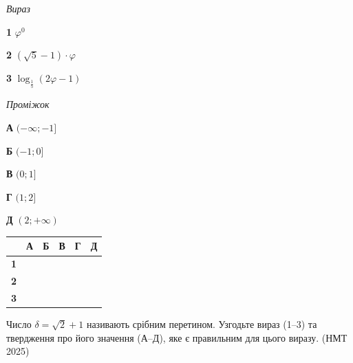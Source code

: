 \documentclass[14pt]{extarticle}
\newcommand{\matchTable}{
\begin{tabular}{|>{\centering\arraybackslash}p{0.3cm}|*{5}{>{\centering\arraybackslash}p{0.3cm}|}}
\hline
& \textbf{А} & \textbf{Б} & \textbf{В} & \textbf{Г} & \textbf{Д} \\
\hline
\textbf{1} & \rule{0pt}{0.3cm} & & & & \\
\hline
\textbf{2} & \rule{0pt}{0.3cm} & & & & \\
\hline
\textbf{3} & \rule{0pt}{0.3cm} & & & & \\
\hline
\end{tabular}
}
\newcommand{\task}[2]{\noindent\makebox[1.5em][l]{\textbf{#1.}}\parbox[t]{\dimexpr\textwidth-1.5em}{#2}}
\newcommand{\nmtyear}[1]{\hfill{\small\color{yearcolor}(НМТ #1)}}
\begin{document}
\vspace{0.3cm}
\begin{minipage}{0.35\textwidth}
\textit{Вираз}

\vspace{0.2cm}
\textbf{1} \quad $\varphi^0$

\vspace{0.2cm}
\textbf{2} \quad $(\sqrt{5} - 1) \cdot \varphi$

\vspace{0.3cm}
\textbf{3} \quad $\log_{\frac{1}{5}}(2\varphi - 1)$
\end{minipage}
\hfill
\begin{minipage}{0.3\textwidth}
\textit{Проміжок}

\vspace{0.2cm}
\textbf{А} \quad $(-\infty; -1]$

\vspace{0.2cm}
\textbf{Б} \quad $(-1; 0]$

\vspace{0.2cm}
\textbf{В} \quad $(0; 1]$

\vspace{0.2cm}
\textbf{Г} \quad $(1; 2]$

\vspace{0.2cm}
\textbf{Д} \quad $(2; +\infty)$
\end{minipage}
\hfill
\begin{minipage}{0.2\textwidth}
\matchTable
\end{minipage}

\vspace{0.7cm}

\task{48}{Число $\delta = \sqrt{2} + 1$ називають срібним перетином. Узгодьте вираз (1--3) та твердження про його значення (А--Д), яке є правильним для цього виразу. \nmtyear{2025}}
\end{document}
